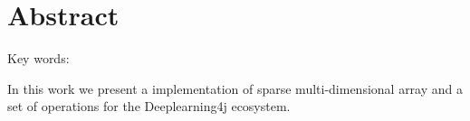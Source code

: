 

\cleardoublepage
\chapter*{Abstract}
\lipsum[1-2]
\vskip0.5cm
Key words: 


In this work we present a implementation of sparse multi-dimensional array and a set of operations for the Deeplearning4j ecosystem.

